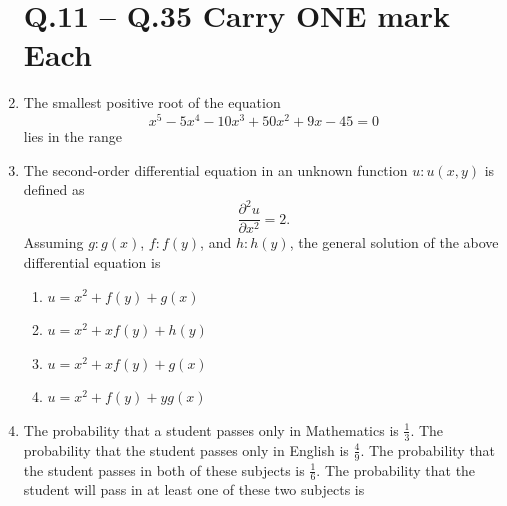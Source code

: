 \documentclass[journal]{IEEEtran}
\begin{document}
\begin{enumerate}
\section*{Q.11 -- Q.35 Carry ONE mark Each}

\item The smallest positive root of the equation  
$$x^5 - 5x^4 - 10x^3 + 50x^2 + 9x - 45 = 0$$  
lies in the range  
\hfill {}  
\begin{enumerate}
\end{enumerate}

\item The second-order differential equation in an unknown function $u: u(x,y)$ is defined as  
$$\frac{\partial^2 u}{\partial x^2} = 2.$$  
Assuming $g: g(x)$, $f: f(y)$, and $h: h(y)$, the general solution of the above differential equation is  
\hfill {}  
\begin{enumerate}
\item $u = x^2 + f(y) + g(x)$
\item $u = x^2 + x f(y) + h(y)$
\item $u = x^2 + x f(y) + g(x)$
\item $u = x^2 + f(y) + y g(x)$
\end{enumerate}

\item The probability that a student passes only in Mathematics is $\tfrac{1}{3}$.  
The probability that the student passes only in English is $\tfrac{4}{9}$.  
The probability that the student passes in both of these subjects is $\tfrac{1}{6}$.  
The probability that the student will pass in at least one of these two subjects is  
\hfill {}  
\begin{enumerate}
\end{enumerate}


\end{enumerate}
\end{document}
